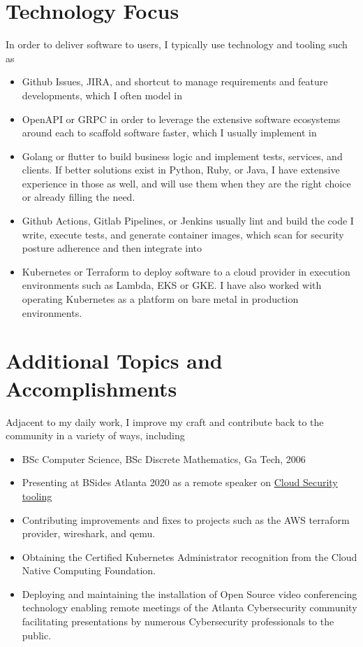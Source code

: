 \documentclass[letterpaper,11pt]{article}
\begin{document}
\section{Technology Focus}
In order to deliver software to users, I typically use technology and tooling such as
\begin{itemize}
  \setlength\itemsep{0.1em}
  \item Github Issues, JIRA, and shortcut to manage requirements and feature developments, which I often model in
  \item OpenAPI or GRPC in order to leverage the extensive software ecosystems around each to scaffold software faster, which I usually implement in
  \item Golang or flutter to build business logic and implement tests, services, and clients. If better solutions exist in Python, Ruby, or Java, I have extensive experience in those as well, and will use them when they are the right choice or already filling the need.
  \item Github Actions, Gitlab Pipelines, or Jenkins usually lint and build the code I write, execute tests, and generate container images, which scan for security posture adherence and then integrate into
  \item Kubernetes or Terraform to deploy software to a cloud provider in execution environments such as Lambda, EKS or GKE. I have also worked with operating Kubernetes as a platform on bare metal in production environments.
\end{itemize}

\section{Additional Topics and Accomplishments}
Adjacent to my daily work, I improve my craft and contribute back to the community in a variety of ways, including
\begin{itemize}
  \setlength\itemsep{0.1em}
	\item BSc Computer Science, BSc Discrete Mathematics, Ga Tech, 2006
	\item Presenting at BSides Atlanta 2020 as a remote speaker on \href{https://www.youtube.com/watch?v=kLCaAaUd1mM}{\color{blue}Cloud Security tooling}
	\item Contributing improvements and fixes to projects such as the AWS terraform provider, wireshark, and qemu.
	\item Obtaining the Certified Kubernetes Administrator recognition from the Cloud Native Computing Foundation.
  \item Deploying and maintaining the installation of Open Source video conferencing technology enabling remote meetings of the Atlanta Cybersecurity community facilitating presentations by numerous Cybersecurity professionals to the public.
\end{itemize}
\end{document}

